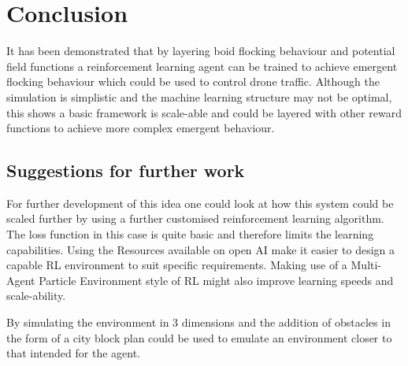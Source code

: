 \section{Conclusion}
It has been demonstrated that by layering boid flocking behaviour and potential field functions a reinforcement learning agent can be trained to achieve emergent flocking behaviour which could be used to control drone traffic. Although the simulation is simplistic and the machine learning structure may not be optimal, this shows a basic framework is scale-able and could be layered with other reward functions to achieve more complex emergent behaviour.

\subsection{Suggestions for further work}
For further development of this idea one could look at how this system could be scaled further by using a further customised reinforcement learning algorithm. The loss function in this case is quite basic and therefore limits the learning capabilities. Using the Resources available on open AI make it easier to design a capable RL environment to suit specific requirements.\cite{AI} Making use of a Multi-Agent Particle Environment style of RL might also improve learning speeds and scale-ability.\cite{MPE} 

By simulating the environment in 3 dimensions and the addition of obstacles in the form of a city block plan could be used to emulate an environment closer to that intended for the agent.

\clearpage %
